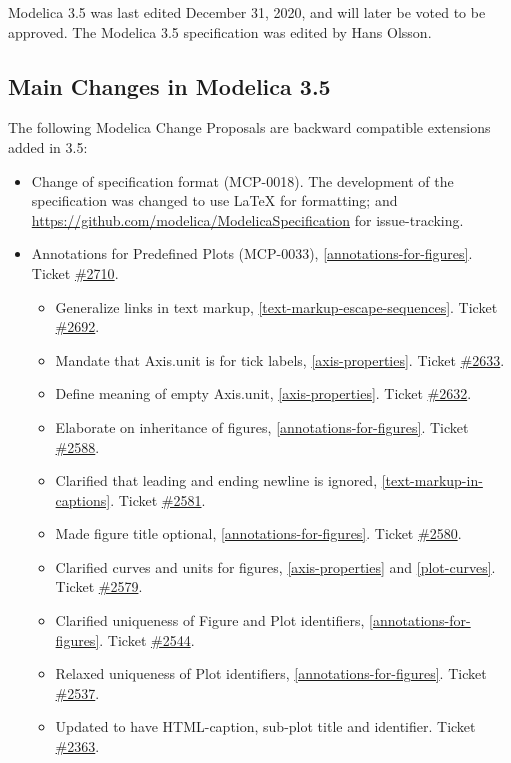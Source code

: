 Modelica 3.5 was last edited December 31, 2020, and will later be voted to be approved.
The Modelica 3.5 specification was edited by Hans Olsson.

\subsection{Main Changes in Modelica 3.5}\label{main-changes-in-modelica-3-5}

The following Modelica Change Proposals are backward compatible extensions added in 3.5:
\begin{itemize}
\item Change of specification format (MCP-0018).
The development of the specification was changed to use \LaTeX{} for formatting; and \url{https://github.com/modelica/ModelicaSpecification} for issue-tracking.
\item Annotations for Predefined Plots (MCP-0033), \cref{annotations-for-figures}. Ticket \href{https://github.com/modelica/ModelicaSpecification/pull/2710}{\#2710}.
\begin{itemize}
\item Generalize links in text markup, \cref{text-markup-escape-sequences}.
Ticket \href{https://github.com/modelica/ModelicaSpecification/pull/2692}{\#2692}.
\item Mandate that Axis.unit is for tick labels, \cref{axis-properties}.
Ticket \href{https://github.com/modelica/ModelicaSpecification/pull/2633}{\#2633}.
\item Define meaning of empty Axis.unit, \cref{axis-properties}.
Ticket \href{https://github.com/modelica/ModelicaSpecification/pull/2632}{\#2632}.
\item Elaborate on inheritance of figures, \cref{annotations-for-figures}.
Ticket \href{https://github.com/modelica/ModelicaSpecification/pull/2588}{\#2588}.
\item Clarified that leading and ending newline is ignored, \cref{text-markup-in-captions}.
Ticket \href{https://github.com/modelica/ModelicaSpecification/pull/2581}{\#2581}.
\item Made figure title optional, \cref{annotations-for-figures}.
Ticket \href{https://github.com/modelica/ModelicaSpecification/pull/2580}{\#2580}.
\item Clarified curves and units for figures, \cref{axis-properties} and \cref{plot-curves}.
Ticket \href{https://github.com/modelica/ModelicaSpecification/pull/2579}{\#2579}.
\item Clarified uniqueness of Figure and Plot identifiers, \cref{annotations-for-figures}.
Ticket \href{https://github.com/modelica/ModelicaSpecification/pull/2544}{\#2544}.
\item Relaxed uniqueness of Plot identifiers, \cref{annotations-for-figures}.
Ticket \href{https://github.com/modelica/ModelicaSpecification/pull/2537}{\#2537}.
\item Updated to have HTML-caption, sub-plot title and identifier.
Ticket \href{https://github.com/modelica/ModelicaSpecification/issues/2363}{\#2363}.
\end{itemize}
\end{itemize}

